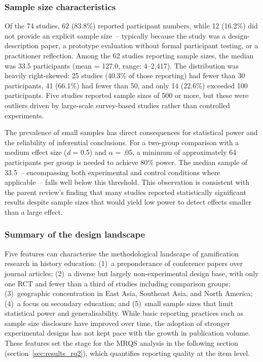 \documentclass[etq]{acnsart}
\begin{document}
	\subsubsection{Sample size characteristics}
	\label{sec:results_rq1_sample}
	
	Of the 74 studies, 62 (83.8\%) reported participant numbers, while 12 (16.2\%) did not provide an explicit sample size~-- typically because the study was a design-description paper, a prototype evaluation without formal participant testing, or a practitioner reflection. Among the 62 studies reporting sample sizes, the median was 33.5 participants (mean = 127.0, range: 4--2,417). The distribution was heavily right-skewed: 25 studies (40.3\% of those reporting) had fewer than 30 participants, 41 (66.1\%) had fewer than 50, and only 14 (22.6\%) exceeded 100 participants. Five studies reported sample sizes of 500 or more, but these were outliers driven by large-scale survey-based studies rather than controlled experiments.
	
	The prevalence of small samples has direct consequences for statistical power and the reliability of inferential conclusions. For a two-group comparison with a medium effect size (\textit{d} = 0.5) and $\alpha$ = .05, a minimum of approximately 64 participants per group is needed to achieve 80\% power. The median sample of 33.5~-- encompassing both experimental and control conditions where applicable~-- falls well below this threshold. This observation is consistent with the parent review's finding that many studies reported statistically significant results despite sample sizes that would yield low power to detect effects smaller than a large effect.
	
	\subsubsection{Summary of the design landscape}
	\label{sec:results_rq1_summary}
	
	Five features can characterise the methodological landscape of gamification research in history education: (1)~a preponderance of conference papers over journal articles; (2)~a diverse but largely non-experimental design base, with only one RCT and fewer than a third of studies including comparison groups; (3)~geographic concentration in East Asia, Southeast Asia, and North America; (4)~a focus on secondary education; and (5)~small sample sizes that limit statistical power and generalisability. While basic reporting practices such as sample size disclosure have improved over time, the adoption of stronger experimental designs has not kept pace with the growth in publication volume. These features set the stage for the MRQS analysis in the following section (section~\ref{sec:results_rq2}), which quantifies reporting quality at the item level.
	
\end{document}
